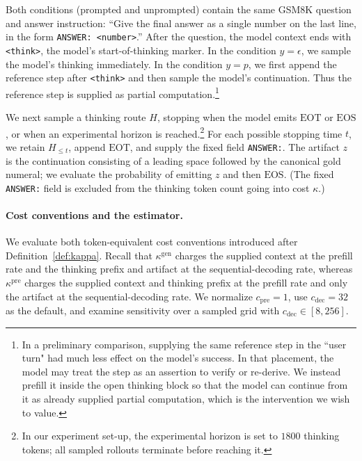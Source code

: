 \documentclass[letterpaper]{article} %
\theoremstyle{definition}
\theoremstyle{remark}
\newcommand{\EOT}{\mathrm{EOT}}
\newcommand{\eps}{\epsilon}
\newcommand{\EOS}{\mathrm{EOS}}
\begin{document}
Both conditions (prompted and unprompted) contain the same GSM8K question and answer instruction:
``Give the final answer as a single number on the last line, in the form
\texttt{ANSWER: <number>}.'' 
After the question, the model context ends
with \texttt{<think>}, the model's start-of-thinking marker. In the condition
\(y=\eps\), we sample the model's thinking immediately. In the condition
\(y=p\), we first append the reference step after \texttt{<think>} and then
sample the model's continuation. Thus the reference step is supplied as partial
computation.\footnote{In a preliminary comparison, supplying the same reference step in
the ``user turn" had much less effect on the model's success. In that placement,
the model may treat the step as an assertion to verify or re-derive. We instead
prefill it inside the open thinking block so that the model can continue from
it as already supplied partial computation, which is the intervention we wish
to value.}

We next sample a thinking route \(H\), stopping when the model emits
\(\EOT\) or \(\EOS\), or when an experimental horizon is reached.\footnote{In our experiment set-up, the experimental horizon is set to \(1800\) thinking tokens; all sampled rollouts terminate before reaching it.} For each
possible stopping time \(t\), we retain \(H_{\leq t}\), append \(\EOT\), and
supply the fixed field \texttt{ANSWER:}. The artifact \(z\) is the continuation
consisting of a leading space followed by the canonical gold numeral; we
evaluate the probability of emitting \(z\) and then \(\EOS\). (The fixed
\texttt{ANSWER:} field is excluded
from the thinking token count going into cost \(\kappa\).)

\paragraph{Cost conventions and the estimator.}
We evaluate both token-equivalent cost conventions introduced after
Definition~\ref{def:kappa}. Recall that
\(\kappa^{\mathrm{gen}}\) charges the supplied context at the prefill rate and
the thinking prefix and artifact at the sequential-decoding rate,
whereas \(\kappa^{\mathrm{pre}}\) charges the supplied context and thinking
prefix at the prefill rate and only the artifact at the
sequential-decoding rate. 
We normalize \(c_{\mathrm{pre}}=1\), use
\(c_{\mathrm{dec}}=32\) as the default, and examine sensitivity over a sampled grid with \(c_{\mathrm{dec}}\in[8,256]\).
\end{document}

